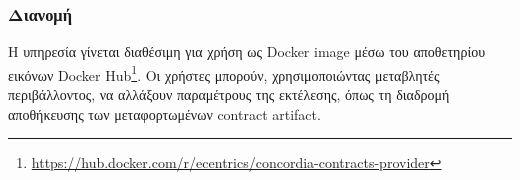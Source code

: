 \subsubsection{Διανομή}

Η υπηρεσία γίνεται διαθέσιμη για χρήση ως Docker image μέσω του αποθετηρίου εικόνων Docker Hub\footnote{\url{https://hub.docker.com/r/ecentrics/concordia-contracts-provider}}. Οι χρήστες μπορούν, χρησιμοποιώντας μεταβλητές περιβάλλοντος, να αλλάξουν παραμέτρους της εκτέλεσης, όπως τη διαδρομή αποθήκευσης των μεταφορτωμένων \textenglish{contract artifact}.